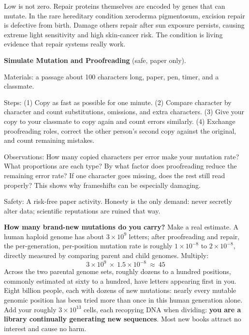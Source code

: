 Low is not zero. Repair proteins themselves are encoded by genes that can mutate. In the rare hereditary condition xeroderma pigmentosum, excision repair is defective from birth. Damage others repair after sun exposure persists, causing extreme light sensitivity and high skin-cancer risk. The condition is living evidence that repair systems really work.

\begin{shiyan}
\textbf{Simulate Mutation and Proofreading} (safe, paper only).

Materials: a passage about 100 characters long, paper, pen, timer, and a classmate.

Steps: (1) Copy as fast as possible for one minute. (2) Compare character by character and count substitutions, omissions, and extra characters. (3) Give your copy to your classmate to copy again and count errors similarly. (4) Exchange proofreading roles, correct the other person's second copy against the original, and count remaining mistakes.

Observations: How many copied characters per error make your mutation rate? What proportions are each type? By what factor does proofreading reduce the remaining error rate? If one character goes missing, does the rest still read properly? This shows why frameshifts can be especially damaging.

Safety: A risk-free paper activity. Honesty is the only demand: never secretly alter data; scientific reputations are ruined that way.
\end{shiyan}

\begin{qiaoliang}
\textbf{How many brand-new mutations do you carry?} Make a real estimate. A human haploid genome has about $3\times 10^{9}$ letters; after proofreading and repair, the per-generation, per-position mutation rate is roughly $1\times 10^{-8}$ to $2\times 10^{-8}$, directly measured by comparing parent and child genomes. Multiply:
\[
3\times 10^{9}\ \times\ 1.5\times 10^{-8}\ \approx\ 45
\]
Across the two parental genome sets, roughly dozens to a hundred positions, commonly estimated at sixty to a hundred, have letters appearing first in you. Eight billion people, each with dozens of new mutations: nearly every mutable genomic position has been tried more than once in this human generation alone. Add your roughly $3\times 10^{13}$ cells, each recopying DNA when dividing: \textbf{you are a library continually generating new sequences}. Most new books attract no interest and cause no harm.
\end{qiaoliang}

